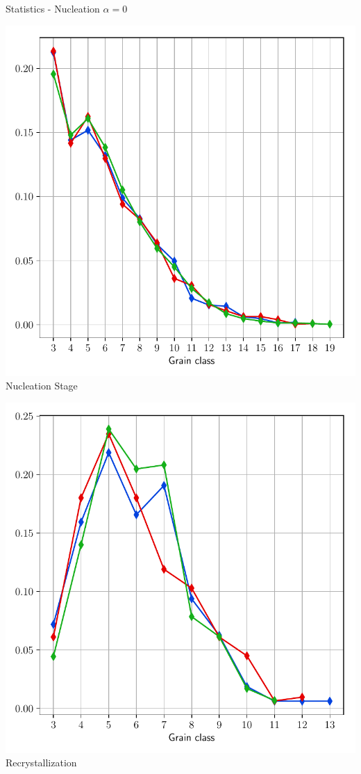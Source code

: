 \documentclass[usenames,dvipsnames]{beamer}
\begin{document}
\begin{frame}{Statistics - Nucleation $\alpha = 0$}
\small
    \begin{minipage}{0.5\textwidth}
    \centering
    \includegraphics[scale=0.35]{figures/stored_energy/SE/nsides/000110_nuclconstant_set.pdf}\\
    Nucleation Stage
    \end{minipage}%
    \begin{minipage}{0.5\textwidth}
    \centering
    \includegraphics[scale=0.35]{figures/stored_energy/SE/nsides/000240_nuclconstant_set.pdf}\\
    Recrystallization
    \end{minipage}
\end{frame}
\end{document}
